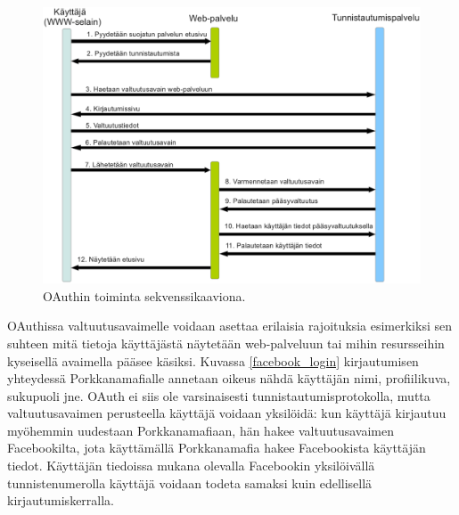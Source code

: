 \begin{figure}[ht]
\centering
\includegraphics[width=\textwidth]{teknologiat/protokollat/oauth.eps}
\caption{OAuthin toiminta sekvenssikaaviona.}%
\label{oauth}
\end{figure}

OAuthissa valtuutusavaimelle voidaan asettaa erilaisia rajoituksia esimerkiksi sen suhteen mitä tietoja käyttäjästä näytetään web-palveluun tai mihin resursseihin kyseisellä avaimella pääsee käsiksi. Kuvassa \ref{facebook_login} kirjautumisen yhteydessä Porkkanamafialle annetaan oikeus nähdä käyttäjän nimi, profiilikuva, sukupuoli jne. OAuth ei siis ole varsinaisesti tunnistautumisprotokolla, mutta valtuutusavaimen perusteella käyttäjä voidaan yksilöidä: kun käyttäjä kirjautuu myöhemmin uudestaan Porkkanamafiaan, hän hakee valtuutusavaimen Facebookilta, jota käyttämällä Porkkanamafia hakee Facebookista käyttäjän tiedot. Käyttäjän tiedoissa mukana olevalla Facebookin yksilöivällä tunnistenumerolla käyttäjä voidaan todeta samaksi kuin edellisellä kirjautumiskerralla.